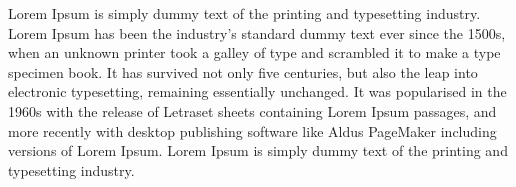 Lorem Ipsum is simply dummy text of the printing and typesetting industry.
Lorem Ipsum has been the industry's standard dummy text ever since the 1500s,
when an unknown printer took a galley of type and scrambled it to make a type
specimen book. It has survived not only five centuries, but also the leap into
electronic typesetting, remaining essentially unchanged. It was popularised in
the 1960s with the release of Letraset sheets containing Lorem Ipsum passages,
and more recently with desktop publishing software like Aldus PageMaker
including versions of Lorem Ipsum. Lorem Ipsum is simply dummy text of the
printing and typesetting industry.
